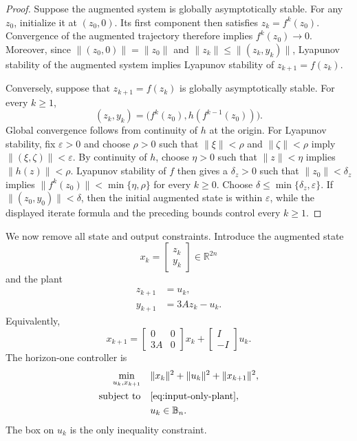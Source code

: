 \documentclass{IEEEtran}
\theoremstyle{remark}
\newcommand{\R}{\mathbb{R}}
\newcommand{\B}{\mathbb{B}}
\begin{document}
\begin{proof}
Suppose the augmented system is globally asymptotically stable.  For any
$z_0$, initialize it at $(z_0,0)$.  Its first component then satisfies
$z_k=f^k(z_0)$.  Convergence of the augmented trajectory therefore implies
$f^k(z_0)\to0$.  Moreover, since $\|(z_0,0)\|=\|z_0\|$ and
$\|z_k\|\le\|(z_k,y_k)\|$, Lyapunov stability of the augmented system implies
Lyapunov stability of $z_{k+1}=f(z_k)$.

Conversely, suppose that $z_{k+1}=f(z_k)$ is globally asymptotically stable.  For every $k\ge1$,
\[
  (z_k,y_k)=\bigl(f^k(z_0),h(f^{k-1}(z_0))\bigr).
\]
Global convergence follows from continuity of $h$ at the origin.  For Lyapunov stability, fix $\varepsilon>0$ and choose $\rho>0$ such that $\|\xi\|<\rho$ and $\|\zeta\|<\rho$ imply $\|(\xi,\zeta)\|<\varepsilon$.  By continuity of $h$, choose $\eta>0$ such that $\|z\|<\eta$ implies $\|h(z)\|<\rho$.  Lyapunov stability of $f$ then gives a $\delta_z>0$ such that $\|z_0\|<\delta_z$ implies $\|f^k(z_0)\|<\min\{\eta,\rho\}$ for every $k\ge0$.  Choose $\delta\le\min\{\delta_z,\varepsilon\}$.  If $\|(z_0,y_0)\|<\delta$, then the initial augmented state is within $\varepsilon$, while the displayed iterate formula and the preceding bounds control every $k\ge1$.
\end{proof}

We now remove all state and output constraints.  Introduce the augmented state
\[
  x_k=\begin{bmatrix}z_k\\y_k\end{bmatrix}\in\R^{2n}
\]
and the plant
\begin{subequations}
\label{eq:input-only-plant}
\begin{align}
  z_{k+1}&=u_k,\\
  y_{k+1}&=3Az_k-u_k.
\end{align}
\end{subequations}
Equivalently,
\[
  x_{k+1}
  =
  \begin{bmatrix}0&0\\3A&0\end{bmatrix}x_k
  +
  \begin{bmatrix}I\\-I\end{bmatrix}u_k.
\]
The horizon-one controller is
\begin{subequations}
\label{eq:input-only-mpc}
\begin{align}
  \min_{u_k,x_{k+1}}\quad &\|x_k\|^2+\|u_k\|^2+\|x_{k+1}\|^2,\\
  \text{subject to}\quad &\eqref{eq:input-only-plant},\\
  &u_k\in\B_n.
\end{align}
\end{subequations}
The box on $u_k$ is the only inequality constraint.
\end{document}
